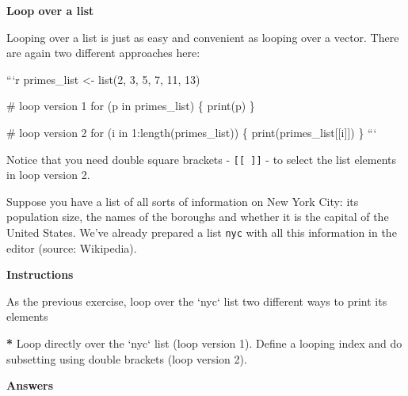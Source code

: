 \documentclass[]{article}
\newcommand{\hlnum}[1]{\textcolor[rgb]{0.816,0.125,0.439}{#1}}%
\newcommand{\hlstr}[1]{\textcolor[rgb]{0.251,0.627,0.251}{#1}}%
\newcommand{\hlstd}[1]{\textcolor[rgb]{0.251,0.251,0.251}{#1}}%
\newcommand{\hlkwc}[1]{\textcolor[rgb]{0.251,0.251,0.251}{#1}}%
\newcommand{\hlkwd}[1]{\textcolor[rgb]{0.878,0.439,0.125}{#1}}%
\newenvironment{Shaded}{\begin{myshaded}}{\end{myshaded}}
\newcommand{\KeywordTok}[1]{\hlkwd{#1}}
\newcommand{\DataTypeTok}[1]{\hlkwc{#1}}
\newcommand{\DecValTok}[1]{\hlnum{#1}}
\newcommand{\StringTok}[1]{\hlstr{#1}}
\newcommand{\ErrorTok}[1]{\textbf{{#1}}}
\newcommand{\NormalTok}[1]{\hlstd{#1}}
\begin{document}
\textbf{Loop over a list}

Looping over a list is just as easy and convenient as looping over a
vector. There are again two different approaches here:

```r primes\_list \textless{}- list(2, 3, 5, 7, 11, 13)

\# loop version 1 for (p in primes\_list) \{ print(p) \}

\# loop version 2 for (i in 1:length(primes\_list)) \{
print(primes\_list{[}{[}i{]}{]}) \} ```

Notice that you need double square brackets - \texttt{{[}{[}\ {]}{]}} -
to select the list elements in loop version 2.

Suppose you have a list of all sorts of information on New York City:
its population size, the names of the boroughs and whether it is the
capital of the United States. We've already prepared a list \texttt{nyc}
with all this information in the editor (source: Wikipedia).

\textbf{Instructions}

\begin{Shaded}
\begin{Highlighting}[]
\NormalTok{As }\NormalTok{ the previous exercise, loop over the }\StringTok{`}\DataTypeTok{nyc}\StringTok{`}\NormalTok{ list }\NormalTok{ two different ways to print its elements}\OperatorTok{:}

\ErrorTok{*}\StringTok{ }\NormalTok{Loop directly over the }\StringTok{`}\DataTypeTok{nyc}\StringTok{`} \KeywordTok{list}\NormalTok{ (loop version }\DecValTok{1}\NormalTok{).}
\OperatorTok{*}\StringTok{ }\NormalTok{Define a looping index and do subsetting using double }\KeywordTok{brackets}\NormalTok{ (loop version }\DecValTok{2}\NormalTok{).}
\end{Highlighting}
\end{Shaded}

\textbf{Answers}
\end{document}
